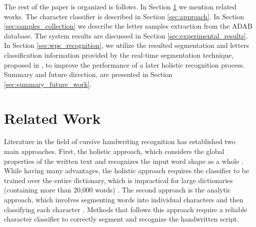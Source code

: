 \documentclass[10pt, conference, compsocconf]{IEEEtran}
\begin{document}

The rest of the paper is organized is follows. 
In Section \ref{sec:related_work} we mention related works. 
The character classifier is described in Section \ref{sec:approach}. 
In Section \ref{sec:samples_collection} we describe the letter samples extraction from the ADAB database.
The system results are discussed in Section \ref{sec:experimental_results}.
In Section \ref{sec:wps_recognition}, we utilize the resulted segmentation and letters classification information provided by the real-time segmentation technique, proposed in \cite{kour2014real}, to improve the performance of a later holistic recognition process.
Summary and future direction, are presented in Section \ref{sec:summary_future_work}. 

\section{Related Work}
\label{sec:related_work}
Literature in the field of cursive handwriting recognition has established two main approaches. 
First, the holistic approach, which considers the global properties of the written text and recognizes the input word shape as a whole \cite{biadsy2011segmentation, saabni2009hierarchical}. 
While having many advantages, the holistic approach requires the classifier to be trained over the entire dictionary, which is impractical for large dictionaries (containing more than 20,000 words) \cite{elanwar2012unconstrained}.
The second approach is the analytic approach, which involves segmenting words into individual characters and then classifying each character \cite{abdulla2008off, sari2002off, Dinges2011}. 
Methods that follows this approach require a reliable character classifier to correctly segment and recognize the handwritten script.
\end{document}
